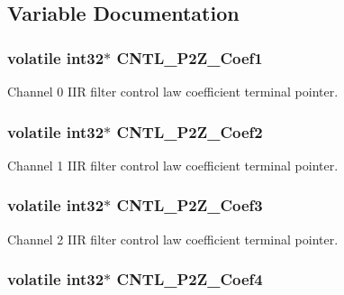 \subsection{Variable Documentation}
\hypertarget{a00010_a047c759a71b80d8cfd5e6f52b1b021b9}{
\subsubsection[{C\-N\-T\-L\-\_\-2\-P2\-Z\-\_\-\-Coef1}]{\setlength{\rightskip}{0pt plus 5cm}volatile int32$\ast$ C\-N\-T\-L\-\_\-P2\-Z\-\_\-\-Coef1}}\label{a00010_a047c759a71b80d8cfd5e6f52b1b021b9}
Channel 0 I\-I\-R filter control law coefficient terminal pointer. \hypertarget{a00010_abdc599cbabc62898c49926678c3327e6}{
\subsubsection[{C\-N\-T\-L\-\_\-2\-P2\-Z\-\_\-\-Coef2}]{\setlength{\rightskip}{0pt plus 5cm}volatile int32$\ast$ C\-N\-T\-L\-\_\-P2\-Z\-\_\-\-Coef2}}\label{a00010_abdc599cbabc62898c49926678c3327e6}
Channel 1 I\-I\-R filter control law coefficient terminal pointer. \hypertarget{a00010_a1e357d296e76299ea04d7a63e4c46d1b}{
\subsubsection[{C\-N\-T\-L\-\_\-2\-P2\-Z\-\_\-\-Coef3}]{\setlength{\rightskip}{0pt plus 5cm}volatile int32$\ast$ C\-N\-T\-L\-\_\-P2\-Z\-\_\-\-Coef3}}\label{a00010_a1e357d296e76299ea04d7a63e4c46d1b}
Channel 2 I\-I\-R filter control law coefficient terminal pointer. \hypertarget{a00010_afe468cb1e995b267671e88b8d292aef6}{
\subsubsection[{C\-N\-T\-L\-\_\-2\-P2\-Z\-\_\-\-Coef4}]{\setlength{\rightskip}{0pt plus 5cm}volatile int32$\ast$ C\-N\-T\-L\-\_\-P2\-Z\-\_\-\-Coef4}}\label{a00010_afe468cb1e995b267671e88b8d292aef6}
